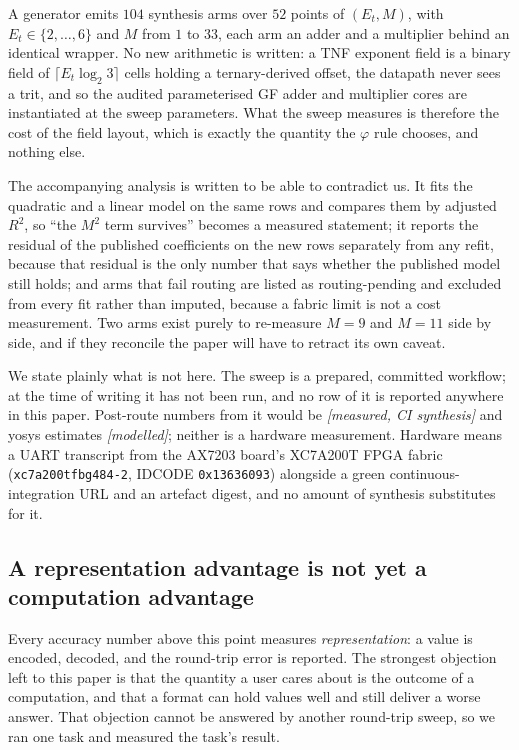 \documentclass[11pt]{article}
\theoremstyle{definition}
\begin{document}
A generator emits $104$ synthesis arms over $52$ points of $(E_t, M)$, with
$E_t \in \{2,\dots,6\}$ and $M$ from $1$ to $33$, each arm an adder and a
multiplier behind an identical wrapper. No new arithmetic is written: a TNF
exponent field is a binary field of $\lceil E_t \log_2 3 \rceil$ cells holding a
ternary-derived offset, the datapath never sees a trit, and so the audited
parameterised GF adder and multiplier cores are instantiated at the sweep
parameters. What the sweep measures is therefore the cost of the field layout,
which is exactly the quantity the $\varphi$ rule chooses, and nothing else.

The accompanying analysis is written to be able to contradict us. It fits the
quadratic and a linear model on the same rows and compares them by adjusted
$R^2$, so ``the $M^2$ term survives'' becomes a measured statement; it reports the
residual of the published coefficients on the new rows separately from any refit,
because that residual is the only number that says whether the published model
still holds; and arms that fail routing are listed as routing-pending and
excluded from every fit rather than imputed, because a fabric limit is not a cost
measurement. Two arms exist purely to re-measure $M = 9$ and $M = 11$ side by side,
and if they reconcile the paper will have to retract its own caveat.

We state plainly what is not here. The sweep is a prepared, committed workflow;
at the time of writing it has not been run, and no row of it is reported anywhere
in this paper. Post-route numbers from it would be \emph{[measured, CI synthesis]}
and yosys estimates \emph{[modelled]}; neither is a hardware measurement. Hardware
means a UART transcript from the AX7203 board's XC7A200T FPGA fabric
(\texttt{xc7a200tfbg484-2}, IDCODE \texttt{0x13636093}) alongside a green
continuous-integration URL and an artefact digest, and no amount of synthesis
substitutes for it.

\subsection{A representation advantage is not yet a computation advantage}
\label{sec:downstream}

Every accuracy number above this point measures \emph{representation}: a value is
encoded, decoded, and the round-trip error is reported. The strongest objection
left to this paper is that the quantity a user cares about is the outcome of a
computation, and that a format can hold values well and still deliver a worse
answer. That objection cannot be answered by another round-trip sweep, so we ran
one task and measured the task's result.
\end{document}

